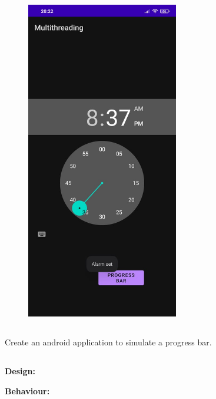 \documentclass[12pt,letterpaper]{article}
\begin{document}
\begin{figure}
    \centering
    \includegraphics[height=14cm, keepaspectratio]{Outputs/Alarm3.jpeg}
\end{figure}

\newpage
\subsection*{}
\begin{flushleft}
    Create an android application to simulate a progress bar.
\end{flushleft}

\subsection*{}
\subsubsection*{}
\textbf{Design:}
\begin{flushleft}

\end{flushleft}
\textbf{Behaviour:}
\begin{flushleft}

\end{flushleft}
\end{document}
